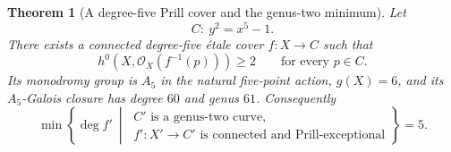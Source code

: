 \documentclass[11pt,reqno]{amsart}
\numberwithin{equation}{section}
\newtheorem{theorem}{Theorem}[section]
\theoremstyle{remark}
\newcommand{\cO}{\mathcal O}
\begin{document}
\begin{theorem}[A degree-five Prill cover and the genus-two minimum]
\label{thm:C5-degree-five}
Let
\[
 C:\ y^2=x^5-1.
\]
There exists a connected degree-five \'etale cover
\(f\colon X\to C\) such that
\[
 h^0\!\left(X,\cO_X(f^{-1}(p))\right)\geq2
 \qquad\text{for every }p\in C.
\tag{6.27}\label{eq:C5-Prill-condition}
\]
Its monodromy group is \(A_5\) in the natural five-point action,
\(g(X)=6\), and its \(A_5\)-Galois closure has degree \(60\) and genus
\(61\).  Consequently
\[
 \min\!\left\{\deg f'\ \middle|\
 \begin{array}{c}
 C'\text{ is a genus-two curve},\\
 f'\colon X'\to C'\text{ is connected and Prill-exceptional}
 \end{array}
 \right\}=\boxed{5}.
\tag{6.28}\label{eq:genus-two-global-minimum}
\]
\end{theorem}
\end{document}
